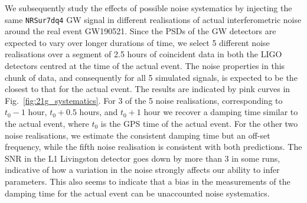\documentclass[twocolumn,prd,superscriptaddress,amsfonts,amssymb,amsmath,preprintnumbers]{revtex4-1}
\begin{document}
We subsequently study the effects of possible noise systematics by injecting the same \texttt{NRSur7dq4} GW signal in different realisations of actual interferometric noise around the real event GW190521. Since the PSDs of the GW detectors are expected to vary over longer durations of time, we select 5 different noise realisations over a segment of 2.5 hours of coincident data in both the LIGO detectors centred at the time of the actual event. The noise properties in this chunk of data, and consequently for all 5 simulated signals, is expected to be the closest to that for the actual event. The results are indicated by pink curves in Fig.~\ref{fig:21g_systematics}. For 3 of the 5 noise realisations, corresponding to $t_0-1$ hour, $t_0+0.5$ hours, and $t_0+1$ hour we recover a damping time similar to the actual event, where $t_0$ is the GPS time of the actual event. For the other two noise realisations, we estimate the consistent damping time but an off-set frequency, while the fifth noise realisation is consistent with both predictions. The SNR in the L1 Livingston detector goes down by more than 3 in some runs, indicative of how a variation in the noise strongly affects our ability to infer parameters. This also seems to indicate that a bias in the measurements of the damping time for the actual event can be unaccounted noise systematics.


%


\end{document}

